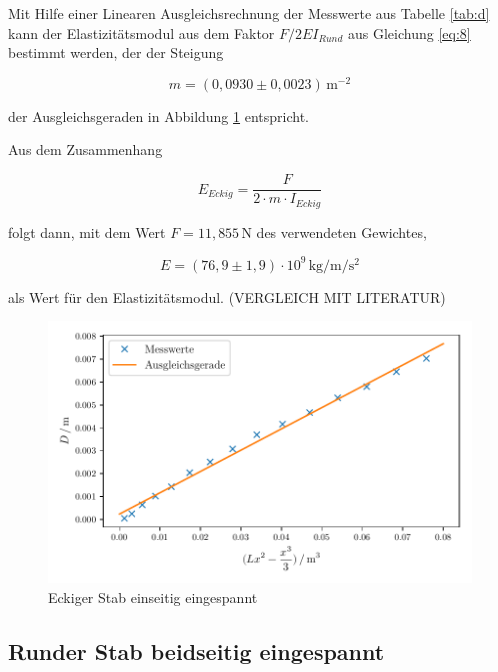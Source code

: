 Mit Hilfe einer Linearen Ausgleichsrechnung der Messwerte
aus Tabelle \ref{tab:d} kann der Elastizitätsmodul aus dem 
Faktor $F/2EI_{Rund}$ aus Gleichung \ref{eq:8} bestimmt werden, der der Steigung 

\begin{equation*}
  m=(0,0930 \pm 0,0023)\,\si{\meter\tothe{-2}}
\end{equation*}

\noindent der Ausgleichsgeraden
in Abbildung \ref{fig:b} entspricht.

Aus dem Zusammenhang 

\begin{equation}
  E_{Eckig}=\frac{F}{2 \cdot m \cdot I_{Eckig}}
\end{equation}

\noindent folgt dann, mit dem Wert $F=11,855\,\si{\newton}$ des verwendeten Gewichtes,

\begin{equation*}
  E=(76,9 \pm 1,9) \cdot 10^9 \,\si{\kilo\gram\per\meter\per\second\squared}
\end{equation*}

\noindent als Wert für den Elastizitätsmodul. (VERGLEICH MIT LITERATUR)



\begin{figure}[H]
  \centering
  \includegraphics{build/plot2.pdf}
  \caption{Eckiger Stab einseitig eingespannt}
  \label{fig:b}
\end{figure}






\subsection{Runder Stab beidseitig eingespannt}


